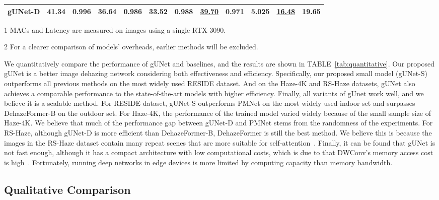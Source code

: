 \documentclass[10pt,twocolumn,letterpaper]{article}
\newcommand{\gr}{\rowcolor[rgb]{0.95,0.97,1.0}}
\begin{document}
\begin{table*}[t]
\begin{center}
{\begin{threeparttable}
\begin{tabular}{lccccccccccc}
                \gr gUNet-D                           & \textbf{41.34} & \textbf{0.996} & \textbf{36.64} & \textbf{0.986} &    \textbf{33.52} & \textbf{0.988} & \underline{39.70} & \textbf{0.971} & {5.025} & \underline{16.48} & {19.65} \\
                \hline
            \end{tabular}
            \begin{tablenotes}
                \small
                \item[1] MACs and Latency are measured on  images using a single RTX 3090.
                \item[2] For a clearer comparison of models' overheads, earlier methods will be excluded.
              \end{tablenotes}
            \end{threeparttable}
        }
    \end{center}
\end{table*}

We quantitatively compare the performance of gUNet and baselines, and the results are shown in TABLE~\ref{tab:quantitative}.
Our proposed gUNet is a better image dehazing network considering both effectiveness and efficiency.
Specifically, our proposed small model (gUNet-S) outperforms all previous methods on the most widely used RESIDE dataset.
And on the Haze-4K and RS-Haze datasets, gUNet also achieves a comparable performance to the state-of-the-art models with higher efficiency.
Finally, all variants of gUnet work well, and we believe it is a scalable method.
For RESIDE dataset, gUNet-S outperforms PMNet on the most widely used indoor set and surpasses DehazeFormer-B on the outdoor set.
For Haze-4K, the performance of the trained model varied widely because of the small sample size of Haze-4K. 
We believe that much of the performance gap between gUNet-D and PMNet stems from the randomness of the experiments.
For RS-Haze, although gUNet-D is more efficient than DehazeFormer-B, DehazeFormer is still the best method.
We believe this is because the images in the RS-Haze dataset contain many repeat scenes that are more suitable for self-attention~\cite{mei2020pyramid}.
Finally, it can be found that gUNet is not fast enough, although it has a compact architecture with low computational costs, which is due to that DWConv's memory access cost is high~\cite{ding2022scaling}.
Fortunately, running deep networks in edge devices is more limited by computing capacity than memory bandwidth.

\subsection{Qualitative Comparison}
\end{document}
